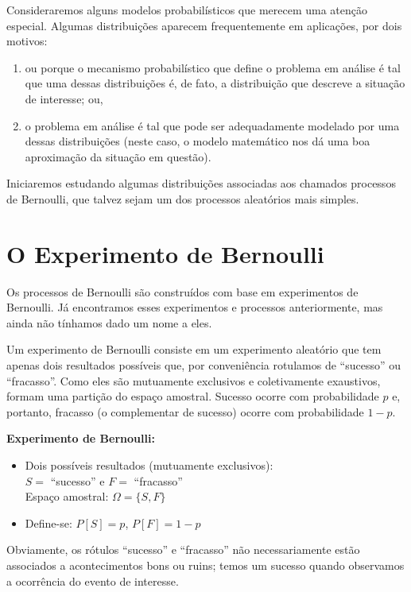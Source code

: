 \documentclass[
]{book}
\theoremstyle{definition}
\theoremstyle{definition}
\theoremstyle{definition}
\theoremstyle{remark}
\begin{document}
Consideraremos alguns modelos probabilísticos que merecem uma atenção especial. Algumas distribuições aparecem frequentemente em aplicações, por dois motivos:

\begin{enumerate}
\def\labelenumi{(\arabic{enumi})}
\item
  ou porque o mecanismo probabilístico que define o problema em análise é tal que uma dessas distribuições é, de fato, a distribuição que descreve a situação de interesse; ou,
\item
  o problema em análise é tal que pode ser adequadamente modelado por uma dessas distribuições (neste caso, o modelo matemático nos dá uma boa aproximação da situação em questão).
\end{enumerate}

Iniciaremos estudando algumas distribuições associadas aos chamados processos de Bernoulli, que talvez sejam um dos processos aleatórios mais simples.

\hypertarget{o-experimento-de-bernoulli}{%
\section{O Experimento de Bernoulli}\label{o-experimento-de-bernoulli}}

Os processos de Bernoulli são construídos com base em experimentos de Bernoulli. Já encontramos esses experimentos e processos anteriormente, mas ainda não tínhamos dado um nome a eles.

Um experimento de Bernoulli consiste em um experimento aleatório que tem apenas dois resultados possíveis que, por conveniência rotulamos de ``sucesso'' ou ``fracasso''. Como eles são mutuamente exclusivos e coletivamente exaustivos, formam uma partição do espaço amostral. Sucesso ocorre com probabilidade \(p\) e, portanto, fracasso (o complementar de sucesso) ocorre com probabilidade \(1-p\).

\textbf{Experimento de Bernoulli:}

\begin{itemize}
\item
  Dois possíveis resultados (mutuamente exclusivos):\\
  \(S =\) ``sucesso'' e \(F=\) ``fracasso''\\
  Espaço amostral: \(\Omega = \{ S, F\}\)
\item
  Define-se: \(P[S] = p\), \(P[F]= 1-p\)
\end{itemize}

Obviamente, os rótulos ``sucesso'' e ``fracasso'' não necessariamente estão associados a acontecimentos bons ou ruins; temos um sucesso quando observamos a ocorrência do evento de interesse.
\end{document}
